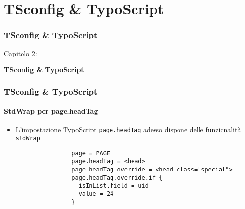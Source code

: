 %

\section{TSconfig \& TypoScript}
\begin{frame}[fragile]
	\frametitle{TSconfig \& TypoScript}

	\begin{center}\huge{Capitolo 2:}\end{center}
	\begin{center}\huge{\color{typo3darkgrey}\textbf{TSconfig \& TypoScript}}\end{center}

\end{frame}


\begin{frame}[fragile]
	\frametitle{TSconfig \& TypoScript}
	\framesubtitle{StdWrap per page.headTag}

	\begin{itemize}
		\item L'impostazione TypoScript \texttt{page.headTag} adesso dispone delle funzionalità \texttt{stdWrap}

			\begin{lstlisting}
				page = PAGE
				page.headTag = <head>
				page.headTag.override = <head class="special">
				page.headTag.override.if {
		  		  isInList.field = uid
		  		  value = 24
				}
			\end{lstlisting}	

	\end{itemize}

\end{frame}

